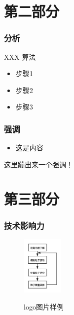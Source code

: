 \section{第二部分}

\begin{frame}
  \frametitle{分析}
  \begin{block}{XXX 算法}
	\begin{itemize}
		\item 步骤1
	 	\item 步骤2
	 	\item 步骤3
	 \end{itemize}
  \end{block}
\end{frame}

\begin{frame}
  \frametitle{强调}
  \begin{itemize}
  \item 这是内容
  \end{itemize}
  \begin{block}{}
    这里蹦出来一个强调！
  \end{block}
\end{frame}




\section{第三部分}
\begin{frame}
  \frametitle{技术影响力}
\end{frame}

\begin{frame}
  \begin{figure}[!h]
    \centering
    \includegraphics[width=2cm]{pics/mcl.png}\\
    \caption{logo图片样例}\label{pic6}
  \end{figure}
  \end{frame}

